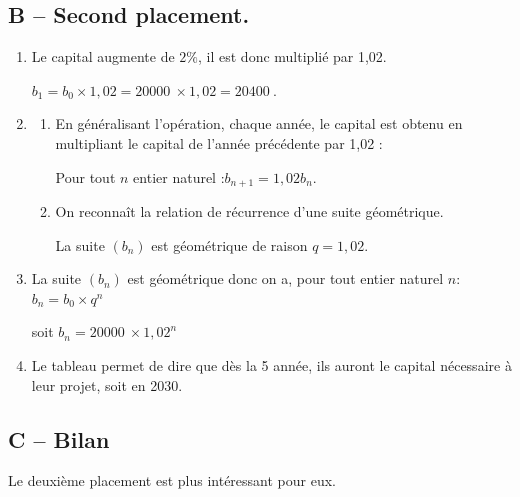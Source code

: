 \documentclass[10pt]{article}
\providecommand{\np}[2][]{{#2~#1}}
\begin{document}
\subsection*{B -- Second placement.}
	\begin{enumerate}
		\item Le capital augmente de $2\%$, il est donc multiplié par 1,02.

			$b_1=b_0 \times 1,02 = \np{20000} \times 1,02=\np{20400}$.

		\item \begin{enumerate}
			\item En généralisant l'opération, chaque année, le capital est obtenu en multipliant le capital de l'année précédente par 1,02 :

			Pour tout $n$ entier naturel :\quad $b_{n+1}=1,02 b_n$.

			\item On reconnaît la relation de récurrence d'une suite géométrique.

			La suite $(b_n)$ est géométrique de raison $q=1,02$.
		\end{enumerate}

		\item La suite $(b_n)$ est géométrique donc on a, pour tout entier naturel $n$: \quad
		$b_n=b_0 \times q^n$

		soit $b_n= \np{20000} \times 1,02^n$

		\item Le tableau permet de dire que dès la 5 année, ils auront le capital nécessaire à leur projet, soit en 2030.
	\end{enumerate}

\subsection*{C -- Bilan}
	Le deuxième placement est plus intéressant pour eux.
\end{document}
